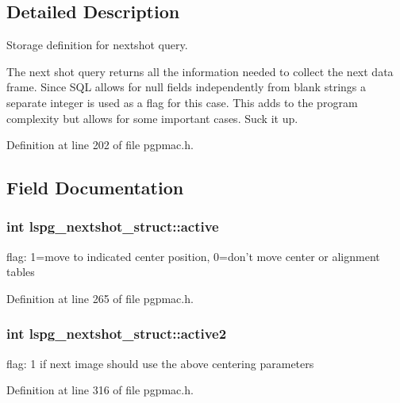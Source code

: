 \subsection{Detailed Description}
Storage definition for nextshot query. 

The next shot query returns all the information needed to collect the next data frame. Since S\-Q\-L allows for null fields independently from blank strings a separate integer is used as a flag for this case. This adds to the program complexity but allows for some important cases. Suck it up. 

Definition at line 202 of file pgpmac.\-h.



\subsection{Field Documentation}
\hypertarget{structlspg__nextshot__struct_a1a94eefbad713976a3d9213695a6ca28}{
\subsubsection[{active}]{\setlength{\rightskip}{0pt plus 5cm}int lspg\-\_\-nextshot\-\_\-struct\-::active}}\label{structlspg__nextshot__struct_a1a94eefbad713976a3d9213695a6ca28}


flag\-: 1=move to indicated center position, 0=don't move center or alignment tables 



Definition at line 265 of file pgpmac.\-h.

\hypertarget{structlspg__nextshot__struct_a2875aa18df587806a3d8c05220fd62b5}{
\subsubsection[{active2}]{\setlength{\rightskip}{0pt plus 5cm}int lspg\-\_\-nextshot\-\_\-struct\-::active2}}\label{structlspg__nextshot__struct_a2875aa18df587806a3d8c05220fd62b5}


flag\-: 1 if next image should use the above centering parameters 



Definition at line 316 of file pgpmac.\-h.

